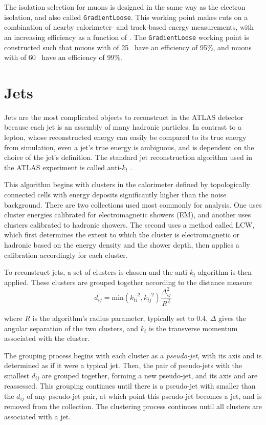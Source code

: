 The isolation selection for muons is designed in the same way as the electron isolation, and also called \texttt{GradientLoose}. This working point makes cuts on a combination of nearby calorimeter- and track-based energy measurements, with an increasing efficiency as a function of \pt. The \texttt{GradientLoose} working point is constructed such that muons with \pt of 25 \gev~have an efficiency of 95\%, and muons with \pt of 60 \gev~have an efficiency of 99\%. 

\section{Jets}
\label{sec:reco_jets}

Jets are the most complicated objects to reconstruct in the \ac{ATLAS} detector because each jet is an assembly of many hadronic particles. In contrast to a lepton, whose reconstructed energy can easily be compared to its true energy from simulation, even a jet's true energy is ambiguous, and is dependent on the choice of the jet's definition. The standard jet reconstruction algorithm used in the \ac{ATLAS} experiment is called anti-$k_t$ \cite{Cacciari:2008gp}. 

This algorithm begins with clusters in the calorimeter defined by topologically connected cells with energy deposits significantly higher than the noise background. There are two collections used most commonly for analysis. One uses cluster energies calibrated for electromagnetic showers (\acs{EM}), and another uses clusters calibrated to hadronic showers. The second uses a method called \ac{LCW}, which first determines the extent to which the cluster is electromagnetic or hadronic based on the energy density and the shower depth, then applies a calibration accordingly for each cluster.

To reconstruct jets, a set of clusters is chosen and the anti-$k_t$ algorithm is then applied. These clusters are grouped together according to the distance measure
\begin{equation}
d_{ij} = \mathrm{min}(k^{-2}_{ti}, k^{-2}_{tj}) \frac{\Delta_{ij}^2}{R^2}
\end{equation}

where $R$ is the algorithm's radius parameter, typically set to 0.4, $\Delta$ gives the angular separation of the two clusters, and $k_t$ is the transverse momentum associated with the cluster. 

The grouping process begins with each cluster as a \textit{pseudo-jet}, with its axis and \pt is determined as if it were a typical jet. Then, the pair of pseudo-jets with the smallest $d_{ij}$ are grouped together, forming a new pseudo-jet, and its axis and \pt are reassessed. This grouping continues until there is a pseudo-jet with \pt smaller than the $d_{ij}$ of any pseudo-jet pair, at which point this pseudo-jet becomes a jet, and is removed from the collection. The clustering process continues until all clusters are associated with a jet. 

